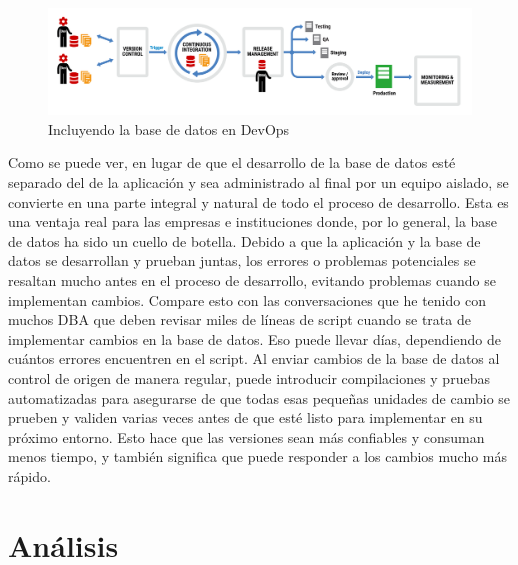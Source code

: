 \documentclass[preprint,12pt]{elsarticle}
\begin{document}
\begin{figure}[htb]
	\begin{center}
		\includegraphics[width=14cm]{./IMAGENES/basededatos_1} 
		\caption{Incluyendo la base de datos en DevOps}
	\end{center}
\end{figure}

Como se puede ver, en lugar de que el desarrollo de la base de datos esté separado del de la aplicación y sea administrado al final por un equipo aislado, se convierte en una parte integral y natural de todo el proceso de desarrollo. Esta es una ventaja real para las empresas e instituciones donde, por lo general, la base de datos ha sido un cuello de botella. Debido a que la aplicación y la base de datos se desarrollan y prueban juntas, los errores o problemas potenciales se resaltan mucho antes en el proceso de desarrollo, evitando problemas cuando se implementan cambios. Compare esto con las conversaciones que he tenido con muchos DBA que deben revisar miles de líneas de script cuando se trata de implementar cambios en la base de datos. Eso puede llevar días, dependiendo de cuántos errores encuentren en el script. Al enviar cambios de la base de datos al control de origen de manera regular, puede introducir compilaciones y pruebas automatizadas para asegurarse de que todas esas pequeñas unidades de cambio se prueben y validen varias veces antes de que esté listo para implementar en su próximo entorno. Esto hace que las versiones sean más confiables y consuman menos tiempo, y también significa que puede responder a los cambios mucho más rápido. \cite{DevopsBD2}





\section{Análisis}
\end{document}
